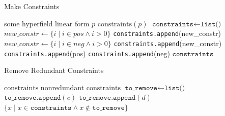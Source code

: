 \begin{algorithm}
\caption{Make Constraints}\label{alg:make_constraints}
\begin{algorithmic}[1]
\Require some hyperfield linear form \( p \)
\Ensure \( \mathrm{constraints}(p) \)
\State $\texttt{constraints} \gets \texttt{list()}$
        \State $new\_constr \gets \{i \mid i \in pos \land i > 0\}$
            \State \texttt{constraints.append}(new\_constr)
        \EndIf
        \State $new\_constr \gets \{i \mid i \in neg \land i > 0\}$
            \State \texttt{constraints.append}(new\_constr)
        \EndIf
            \State \texttt{constraints.append}(pos)
        \EndIf
            \State \texttt{constraints.append}(neg)
        \EndIf
    \EndIf
\EndFor
\State \Return \( \texttt{constraints} \)
\end{algorithmic}
\end{algorithm}

\begin{algorithm}
\caption{Remove Redundant Constraints}
\label{alg:remove_redundant_constraints}
\begin{algorithmic}[1]
\Require \( \mathrm{constraints} \)
\Ensure nonredundant \( \mathrm{constraints} \)
\State $\texttt{to\_remove} \gets \texttt{list()}$
            \State $\texttt{to\_remove.append}(c)$
        \EndIf
            \State $\texttt{to\_remove.append}(d)$
        \EndIf
    \EndFor
\EndFor
\State \Return $\{x \mid x \in \texttt{constraints} \land x \notin \texttt{to\_remove}\}$
\end{algorithmic}
\end{algorithm}
    
